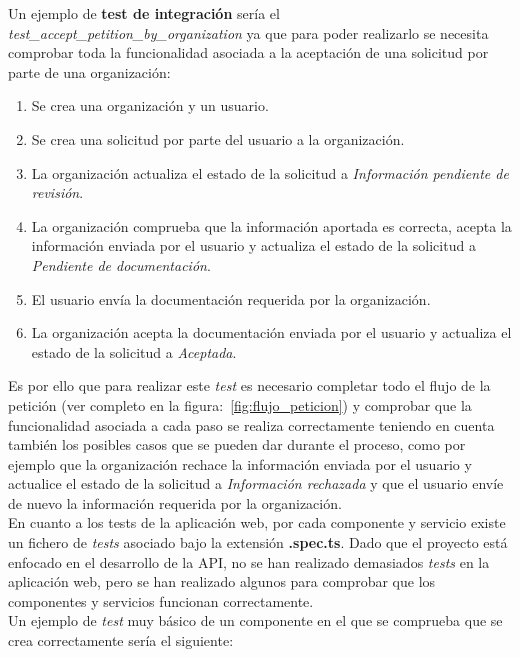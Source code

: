 Un ejemplo de \textbf{test de integración} sería el \textit{test\_accept\_petition\_by\_organization} ya que
para poder realizarlo se necesita comprobar toda la funcionalidad asociada a la aceptación de una solicitud por parte de una organización:

\begin{enumerate}
    \item Se crea una organización y un usuario.
    \item Se crea una solicitud por parte del usuario a la organización.
    \item La organización actualiza el estado de la solicitud a \textit{Información pendiente de revisión}.
    \item La organización comprueba que la información aportada es correcta, acepta la información enviada por el usuario y actualiza el estado de la solicitud a \textit{Pendiente de documentación}.
    \item El usuario envía la documentación requerida por la organización.
    \item La organización acepta la documentación enviada por el usuario y actualiza el estado de la solicitud a \textit{Aceptada}.
\end{enumerate}

Es por ello que para realizar este \textit{test} es necesario completar todo el flujo de la petición (ver completo en la figura:~\ref{fig:flujo_peticion}) y comprobar que
la funcionalidad asociada a cada paso se realiza correctamente teniendo en cuenta también los posibles casos que se pueden
dar durante el proceso, como por ejemplo que la organización rechace la información enviada por el usuario y actualice el estado de la solicitud a \textit{Información rechazada}
y que el usuario envíe de nuevo la información requerida por la organización. \\

En cuanto a los tests de la aplicación web, por cada componente y servicio existe un fichero de \textit{tests} asociado bajo
la extensión \textbf{.spec.ts}. Dado que el proyecto está enfocado en el desarrollo de la API, no se han realizado demasiados
\textit{tests} en la aplicación web, pero se han realizado algunos para comprobar que los componentes y servicios funcionan correctamente. \\

Un ejemplo de \textit{test} muy básico de un componente en el que se comprueba que se crea correctamente sería el siguiente:

